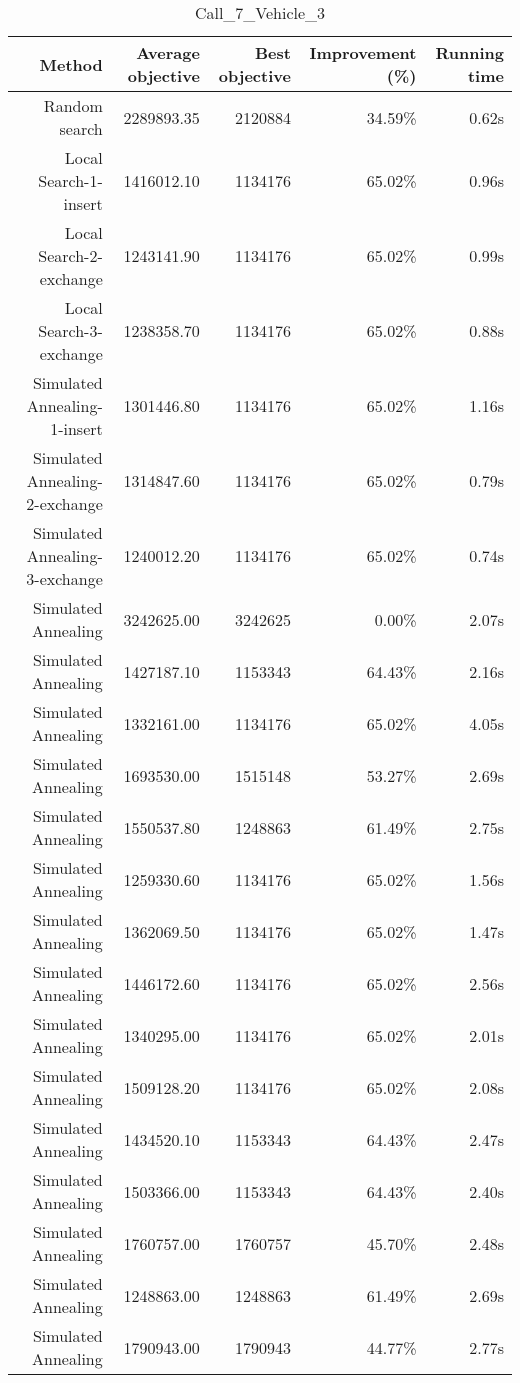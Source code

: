\begin{table}[ht]
\centering
\caption{Call\_7\_Vehicle\_3}
\label{tab:call7vehicle3}
\begin{tabular}{|r|r|r|r|r|}
Method & Average objective & Best objective & Improvement (\%) & Running time \\
\hline
Random search & 2289893.35 & 2120884 & 34.59\% & 0.62s\\
Local Search-1-insert & 1416012.10 & 1134176 & 65.02\% & 0.96s\\
Local Search-2-exchange & 1243141.90 & 1134176 & 65.02\% & 0.99s\\
Local Search-3-exchange & 1238358.70 & 1134176 & 65.02\% & 0.88s\\
Simulated Annealing-1-insert & 1301446.80 & 1134176 & 65.02\% & 1.16s\\
Simulated Annealing-2-exchange & 1314847.60 & 1134176 & 65.02\% & 0.79s\\
Simulated Annealing-3-exchange & 1240012.20 & 1134176 & 65.02\% & 0.74s\\
Simulated Annealing & 3242625.00 & 3242625 & 0.00\% & 2.07s\\
Simulated Annealing & 1427187.10 & 1153343 & 64.43\% & 2.16s\\
Simulated Annealing & 1332161.00 & 1134176 & 65.02\% & 4.05s\\
Simulated Annealing & 1693530.00 & 1515148 & 53.27\% & 2.69s\\
Simulated Annealing & 1550537.80 & 1248863 & 61.49\% & 2.75s\\
Simulated Annealing & 1259330.60 & 1134176 & 65.02\% & 1.56s\\
Simulated Annealing & 1362069.50 & 1134176 & 65.02\% & 1.47s\\
Simulated Annealing & 1446172.60 & 1134176 & 65.02\% & 2.56s\\
Simulated Annealing & 1340295.00 & 1134176 & 65.02\% & 2.01s\\
Simulated Annealing & 1509128.20 & 1134176 & 65.02\% & 2.08s\\
Simulated Annealing & 1434520.10 & 1153343 & 64.43\% & 2.47s\\
Simulated Annealing & 1503366.00 & 1153343 & 64.43\% & 2.40s\\
Simulated Annealing & 1760757.00 & 1760757 & 45.70\% & 2.48s\\
Simulated Annealing & 1248863.00 & 1248863 & 61.49\% & 2.69s\\
Simulated Annealing & 1790943.00 & 1790943 & 44.77\% & 2.77s\\

\end{tabular}
\end{table}

